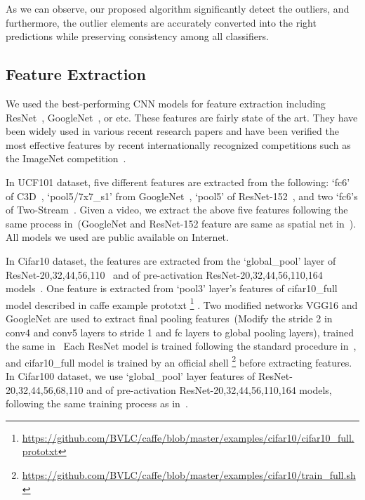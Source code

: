 \documentclass[10pt,twocolumn,letterpaper]{article}
\begin{document}
As we can observe, our proposed algorithm significantly detect the outliers,
and furthermore, the outlier elements are accurately converted into the right predictions while preserving consistency among all classifiers.



\subsection{Feature Extraction}
We used the best-performing CNN models for feature extraction including ResNet~\cite{he2015deep}, GoogleNet~\cite{szegedy2015going}, or etc.
These features are fairly state of the art.
They have been widely used in various recent research papers and have been verified the most effective features by recent internationally recognized competitions such as the ImageNet competition~\cite{russakovsky2015imagenet}.

In UCF101 dataset, five different features are extracted from the following:
`fc6' of C3D~\cite{tran2015learning},
`pool5/7x7\_s1' from GoogleNet~\cite{szegedy2015going},
`pool5' of ResNet-152~\cite{he2015deep},
and two `fc6's of Two-Stream~\cite{simonyan2014two}.
Given a video, we extract the above five features following the same process in~\cite{simonyan2014two,tran2015learning}(GoogleNet and ResNet-152 feature are same as spatial net in~\cite{simonyan2014two}).
All models we used are public available on Internet. %

In Cifar10 dataset, the features are extracted from the `global\_pool' layer of ResNet-20,32,44,56,110~\cite{he2015deep} and of pre-activation ResNet-20,32,44,56,110,164 models~\cite{he2016identity}.
One feature is extracted from `pool3' layer's features of cifar10\_full model described in caffe example prototxt
\footnote{\url{https://github.com/BVLC/caffe/blob/master/examples/cifar10/cifar10_full.prototxt}}
.
Two modified networks VGG16 and GoogleNet are used to extract final pooling features~(Modify the stride 2 in conv4 and conv5 layers to stride 1 and fc layers to global pooling layers), trained the same in~\cite{he2015deep}
Each ResNet model is trained following the standard procedure in~\cite{he2015deep,he2016identity}, and cifar10\_full model is trained by an official shell
\footnote{\url{https://github.com/BVLC/caffe/blob/master/examples/cifar10/train_full.sh}}
before extracting features.
In Cifar100 dataset, we use `global\_pool' layer features of ResNet-20,32,44,56,68,110 and of pre-activation ResNet-20,32,44,56,110,164 models, following the same training process as in~\cite{he2015deep,he2016identity}.
\end{document}
